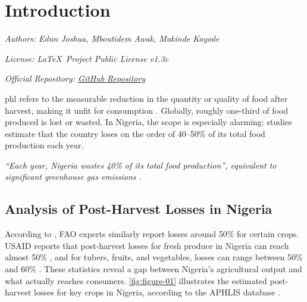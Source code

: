 \chapter[Introduction]{Introduction}
\label{cp:introduction}

{
\parindent0pt

\textit{Authors: Edun Joshua, Mboutidem Awak, Makinde Kayode}


\textit{License: \LaTeX~Project Public License v1.3c}

\textit{Official Repository: \href{https://github.com/joseareia/ipleiria-thesis}{GitHub Repository}}

\vspace{.935em}

\acrfull{phl} refers to the measurable reduction in the quantity or quality of food after harvest, making it unfit for consumption
 \citep{FAO_PostHarvest}. Globally, roughly one-third of food produced is lost or wasted. In Nigeria, the scope is especially alarming: studies estimate that the country loses on the order of 40–50\% of its total food production each year.



\begin{block}[note]
    \textit{“Each year, Nigeria wastes 40\% of its total food production”, equivalent to significant greenhouse gas emissions
    \citep{worldbank2020}.}
    \end{block}
    


 \section{Analysis of Post-Harvest Losses in Nigeria}   

According to \citet{NAN2024}, FAO experts similarly report losses around 50\% for certain crops. 
USAID reports that post-harvest losses for fresh produce in Nigeria can reach almost 50\% \citet{Udi2024}, and for tubers, fruits, and vegetables, losses can range between 50\% and 60\% \citep{OkojieJaiyesimi2024}.
These statistics reveal a gap between Nigeria’s agricultural output and what actually reaches consumers. \autoref{fig:figure-01} illustrates the estimated post-harvest losses for key crops in Nigeria, according to the APHLIS database \citep{APHLIS}.


}
